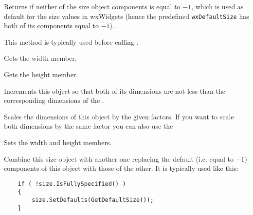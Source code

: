 
Returns \true if neither of the size object components is equal to $-1$, which
is used as default for the size values in wxWidgets (hence the predefined
\texttt{wxDefaultSize} has both of its components equal to $-1$).

This method is typically used before calling
.


\label{wxsizegetwidth}


Gets the width member.


\label{wxsizegetheight}


Gets the height member.



\label{wxsizeincto}


Increments this object so that both of its dimensions are not less than the
corresponding dimensions of the .





\label{wxsizescale}


Scales the dimensions of this object by the given factors.
If you want to scale both dimensions by the same factor you can also use
the 



\label{wxsizeset}


Sets the width and height members.


\label{wxsizesetdefaults}


Combine this size object with another one replacing the default (i.e. equal
to $-1$) components of this object with those of the other. It is typically
used like this:
\begin{verbatim}
    if ( !size.IsFullySpecified() )
    {
        size.SetDefaults(GetDefaultSize());
    }
\end{verbatim}

